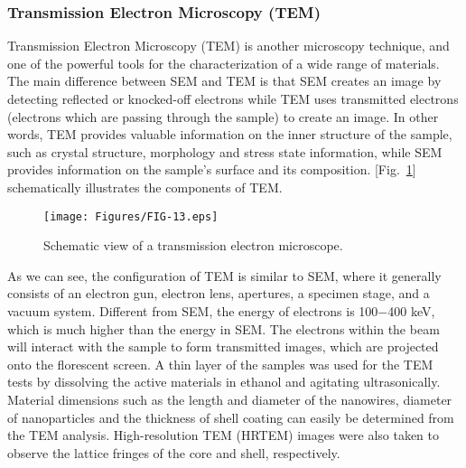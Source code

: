 \documentclass[reprint,amsmath,amssymb,aps,floatfix,
]{revtex4-2}
\begin{document}
\subsubsection{Transmission Electron Microscopy (TEM)}
Transmission Electron Microscopy (TEM) is another microscopy technique, and one of the powerful tools for the characterization of a wide range of materials. The main difference between SEM and TEM is that SEM creates an image by detecting reflected or knocked-off electrons while TEM uses transmitted electrons (electrons which are passing through the sample) to create an image. In other words, TEM provides valuable information on the inner structure of the sample, such as crystal structure, morphology and stress state information, while SEM provides information on the sample's surface and its composition. [Fig.~\ref{fig:fig13}] schematically illustrates the components of TEM.
\begin{figure}[b]
    \centering
    \texttt{[image: Figures/FIG-13.eps]}
    \caption{\label{fig:fig13}Schematic view of a transmission electron microscope.}
    \end{figure}
As we can see, the configuration of TEM is similar to SEM, where it generally consists of an electron gun, electron lens, apertures, a specimen stage, and a vacuum system. Different from SEM, the energy of electrons is 100$-$400 keV, which is much higher than the energy in SEM. The electrons within the beam will interact with the sample to form transmitted images, which are projected onto the florescent screen. A thin layer of the samples was used for the TEM tests by dissolving the active materials in ethanol and agitating ultrasonically. Material dimensions such as the length and diameter of the nanowires, diameter of nanoparticles and the thickness of shell coating can easily be determined from the TEM analysis. High-resolution TEM (HRTEM) images were also taken to observe the lattice fringes of the core and shell, respectively.
\end{document}
